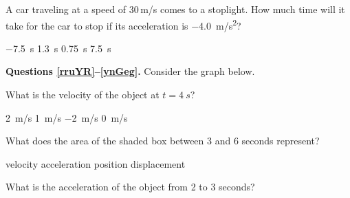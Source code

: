 \documentclass[../main-physics-problems.tex]{subfiles}
\begin{document}
\begin{questions}
\question
A car traveling at a speed of 30\,m/s comes to a stoplight.  How much time will it take for the car to stop if its
acceleration is \SI{-4.0}{m/s^2}?

\begin{randomizechoices}
    \choice \SI{-7.5}{s}
    \choice \SI{1.3}{s}
    \choice \SI{0.75}{s}
    \correctchoice \SI{7.5}{s}
\end{randomizechoices}

\begin{EnvUplevel}
    \textbf{Questions \ref{rruYR}--\ref{ynGeg}.} Consider the graph below.
\end{EnvUplevel}

\begin{center}
\end{center}

\question \label{rruYR}
What is the velocity of the object at $t = \SI{4}{s}$?

\begin{randomizechoices}
    \correctchoice \SI{2}{m/s}
    \choice \SI{1}{m/s}
    \choice \SI{-2}{m/s}
    \choice \SI{0}{m/s}
\end{randomizechoices}

\question
What does the area of the shaded box between 3 and 6 seconds represent?

\begin{randomizechoices}
    \choice velocity
    \choice acceleration
    \choice position
    \correctchoice displacement
\end{randomizechoices}

\question \label{ynGeg}
What is the acceleration of the object from 2 to 3 seconds?


\end{questions}
\end{document}
